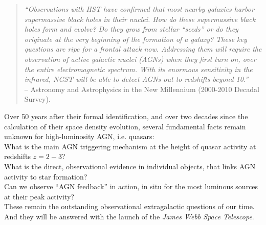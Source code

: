 
\begin{quote}
{\it ``Observations with HST have confirmed that most nearby galaxies harbor supermassive black holes in their nuclei.
How do these supermassive black holes form and evolve? Do they grow from stellar “seeds” or do they originate at the very beginning of the formation of a galaxy? These key questions are ripe for a frontal attack now. Addressing them will require the observation of active galactic nuclei (AGNs) when they first turn on, over the entire electromagnetic spectrum. With its enormous sensitivity in the infrared, NGST will be able to detect AGNs out to redshifts beyond 10.''} \\
-- Astronomy and Astrophysics in the New Millennium (2000-2010 Decadal Survey). 
\end{quote}

\noindent
Over 50 years after their formal identification, and over two decades since the calculation of their space density evolution, several fundamental facts remain unknown for high-luminosity AGN, i.e. quasars: \\
\noindent
What is the main AGN triggering mechanism at the height of quasar activity at redshifts $z=2-3$? \\ 
\noindent
What is the direct, observational evidence in individual objects, that links AGN activity to star formation? \\
\noindent
Can we observe ``AGN feedback'' in action, in situ for the most luminous sources at their peak activity?\\ 

\noindent
These remain the outstanding observational extragalactic questions of
our time. And they will be answered with the launch of the {\it James
Webb Space Telescope}.

